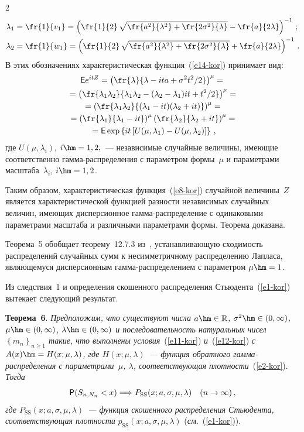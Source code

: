 \begin{multicols}{2}
\begin{align*}
\lambda_1 &= \fr{1}{v_{1}}  = \left(\fr{1}{2}\,\sqrt{\fr{a^{2}}
{\lambda^{2}}+\fr{2\sigma^{2}}{\lambda}} -\fr{a}
{2\lambda}\right)^{-1}\,;
\\
\lambda_2 &= \fr{1}{w _{1}}  =
\left(\fr{1}{2}\,\sqrt{\fr{a^{2}}{\lambda^{2}}+\fr{2\sigma^{2}}{\lambda}} +\fr{a}
{2\lambda}\right)^{-1}\,.
\end{align*}
В этих обозначениях характеристическая функция~(\ref{e14-kor}) принимает вид:
\begin{multline*}
{\sf E}e^{itZ}=\left (\fr{\lambda}{\lambda - ita  +
\sigma^{2}t^{2}/2}\right )^{\mu} = {}\\
{}=\left(
\fr{\lambda_1\lambda_2}{\lambda_1\lambda_2 -(\lambda_2 -
\lambda_1)it +t^{2}/2}\right )^{\mu} =
{}\\
{}
=\left(
\fr{\lambda_1\lambda_2}{(\lambda_1-it)(\lambda_2+it)}\right)^{\mu} ={}\\
{}=
 \left (\fr{\lambda_1}{\lambda_1-it}\right )^{\mu} \left( 
\fr{\lambda_2}{\lambda_2 + it}\right )^{\mu} = {}\\
{}=
{\sf E}\exp\left\{it\left[U(\mu, \lambda_1) - U(\mu,
\lambda_2)\right]\right\}\,,
\end{multline*}
где $U(\mu,\lambda_i)$, $i\hm=1,2,$~--- независимые случайные
величины, имеющие соответственно гам\-ма-рас\-пре\-де\-ле\-ния с параметром
формы~$\mu$ и параметрами масштаба~$\lambda_i$, $i\hm=1,2$.

Таким образом, характеристическая функция~(\ref{e8-kor}) случайной величины~$Z$ 
является характеристической функцией разности независимых\linebreak
случайных величин, имеющих дисперсионное гам\-ма-рас\-пре\-де\-ле\-ние с
одинаковыми параметрами масштаба и различными параметрами формы.
Теорема доказана.

\smallskip

Теорема~5 обобщает теорему~12.7.3 из~\cite{KorolevBeningShorgin2011}, 
устанавливающую сходимость распределений случайных сумм к несимметричному распределению\linebreak
Лапласа, являющемуся дисперсионным гам\-ма-рас\-пре\-де\-ле\-ни\-ем с
параметром $\mu\hm=1$.

Из следствия~1 и определения скошенного распределения Стьюдента~(\ref{e1-kor}) 
вытекает следующий результат.


\smallskip

\noindent
\textbf{Теорема~6}. \textit{Предположим, что существуют числа $a  \hm\in
\mathbb{R}$, $\sigma^{2} \hm\in (0, \infty )$, $\mu\hm\in(0,\infty)$,
$\lambda \hm\in (0, \infty )$ и последовательность натуральных чисел
$\left\{m_n \right\}_{n \geqslant 1}$ такие, что выполнены условия}~(\ref{e11-kor}) 
\textit{и}~(\ref{e12-kor}) \textit{с $A(x)\hm=H(x;\mu,\lambda)$, где $H(x;\mu,\lambda)$~---
функция обратного гам\-ма-рас\-пре\-де\-ле\-ния с параметрами~$\mu$,
$\lambda$, соответствующая плот\-ности}~(\ref{e2-kor}). \textit{Тогда}
$$
{\sf P}(S_{n, N_{n}}<x)\Longrightarrow
P_{\mathrm{SS}}(x;a,\sigma,\mu,\lambda) \quad  (n\rightarrow \infty)\,,
$$
\textit{где $P_{\mathrm{SS}}(x;a,\sigma,\mu,\lambda)$~--- функция скошенного
распределения Стьюдента, соответствующая плот\-ности}
$p_{\mathrm{SS}}(x;a,\sigma,\mu,\lambda)$ (\textit{см}.~(\ref{e1-kor})).


\end{multicols}
